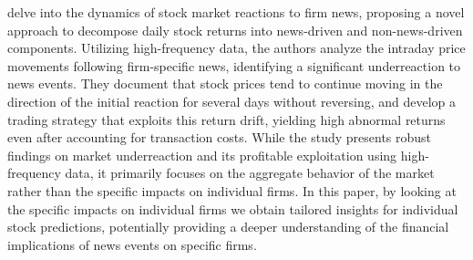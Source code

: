 \mx 

\cite{jiang2021pervasive} delve into the dynamics of stock market reactions to firm news, proposing a novel approach to decompose daily stock returns into news-driven and non-news-driven components. Utilizing high-frequency data, the authors analyze the intraday price movements following firm-specific news, identifying a significant underreaction to news events. They document that stock prices tend to continue moving in the direction of the initial reaction for several days without reversing, and develop a trading strategy that exploits this return drift, yielding high abnormal returns even after accounting for transaction costs. While the study presents robust findings on market underreaction and its profitable exploitation using high-frequency data, it primarily focuses on the aggregate behavior of the market rather than the specific impacts on individual firms. In this paper, by looking at the specific impacts on individual firms we obtain tailored insights for individual stock predictions, potentially providing a deeper understanding of the financial implications of news events on specific firms. 

\mx 

